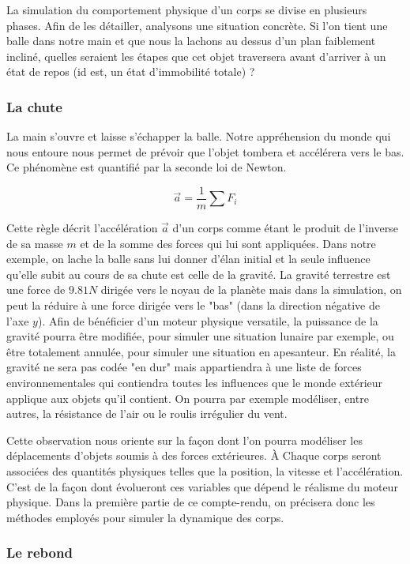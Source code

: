 La simulation du comportement physique d'un corps se divise en plusieurs phases. Afin de les détailler, analysons une situation concrète. Si l'on tient une balle dans notre main et que nous la lachons au dessus d'un plan faiblement incliné, quelles seraient les étapes que cet objet traversera avant d'arriver à un état de repos (id est, un état d'immobilité totale) ?

\subsubsection{La chute}

La main s'ouvre et laisse s'échapper la balle. Notre appréhension du monde qui nous entoure nous permet de prévoir que l'objet tombera et accélérera vers le bas. Ce phénomène est quantifié par la seconde loi de Newton.

\[
\vec{a} = \frac{1}{m} \sum{F_i}
\]

Cette règle décrit l'accélération $\vec{a}$ d'un corps comme étant le produit de l'inverse de sa masse $m$ et de la somme des forces qui lui sont appliquées. Dans notre exemple, on lache la balle sans lui donner d'élan initial et la seule influence qu'elle subit au cours de sa chute est celle de la gravité. La gravité terrestre est une force de $9.81 N$ dirigée vers le noyau de la planète mais dans la simulation, on peut la réduire à une force dirigée vers le "bas" (dans la direction négative de l'axe $y$). Afin de bénéficier d'un moteur physique versatile, la puissance de la gravité pourra être modifiée, pour simuler une situation lunaire par exemple, ou être totalement annulée, pour simuler une situation en apesanteur. En réalité, la gravité ne sera pas codée "en dur" mais appartiendra à une liste de forces environnementales qui contiendra toutes les influences que le monde extérieur applique aux objets qu'il contient. On pourra par exemple modéliser, entre autres, la résistance de l'air ou le roulis irrégulier du vent.

Cette observation nous oriente sur la façon dont l'on pourra modéliser les déplacements d'objets soumis à des forces extérieures. \`A Chaque corps seront associées des quantités physiques telles que la position, la vitesse et l'accélération. C'est de la façon dont évolueront ces variables que dépend le réalisme du moteur physique. Dans la première partie de ce compte-rendu, on précisera donc les méthodes employés pour simuler la dynamique des corps.

\subsubsection{Le rebond}

